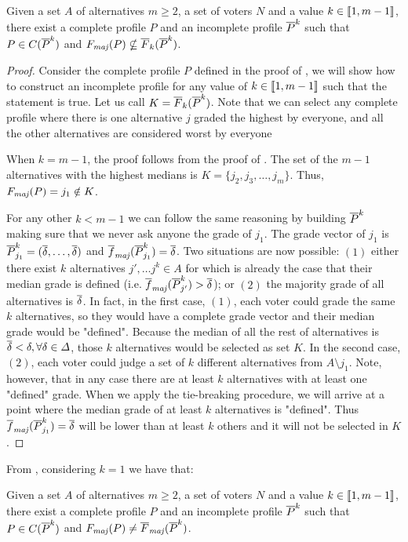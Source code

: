 	\begin{theorem}
		\label{th:uncompleteK}
		Given a set $A$ of alternatives $m\geq 2$, a set of voters $N$ and a value $k\in \llbracket1,m-1\rrbracket$, there exist a complete profile $P$ and an incomplete profile $\overline{P}^k$ such that $P \in C(\overline{P}^k)$ and $\Fmaj(P) \nsubseteq \overline{F}_k(\Pbar^k)$.
	\end{theorem}
	\begin{proof}
		Consider the complete profile $P$ defined in the proof of , we will show how to construct an incomplete profile for any value of $k\in \llbracket1,m-1\rrbracket$ such that the statement is true. Let us call $K=\overline{F}_k(\overline{P}^k)$.
		Note that we can select any complete profile where there is one alternative $j$ graded the highest by everyone, and all the other alternatives are considered worst by everyone
		
		When $k=m-1$, the proof follows from the proof of . The set of the $m-1$ alternatives with the highest medians is $K=\{j_2,j_3,\dots,j_m\}$. Thus, $\Fmaj(P)=j_1 \notin K$.
		
		For any other $k<m-1$ we can follow the same reasoning by building $\overline{P}^k$ making sure that we never ask anyone the grade of $j_1$. 
		The grade vector of $j_1$ is $\overline{P}^k_{j_1}=(\overline{\delta}, \dots, \overline{\delta})$ and $\fmajbar(\Pbar^k_{j_1})=\dbar$.
		Two situations are now possible: $(1)$ either there exist $k$ alternatives $j',\dots j^k\in A$ for which is already the case that their median grade is defined (i.e. $\fmajbar(\Pbar^k_{j'})>\dbar$); or $(2)$ the majority grade of all alternatives is $\overline{\delta}$. 
		In fact, in the first case, $(1)$, each voter could grade the same $k$ alternatives, so they would have a complete grade vector and their median grade would be "defined". Because the median of all the rest of alternatives is $\overline{\delta} < \delta, \forall \delta \in \Delta$, those $k$ alternatives would be selected as set $K$.
		In the second case, $(2)$, each voter could judge a set of $k$ different alternatives from $A\setminus j_1$. Note, however, that in any case there are at least $k$ alternatives with at least one "defined" grade. When we apply the tie-breaking procedure, we will arrive at a point where the median grade of at least $k$ alternatives is "defined". Thus $\fmajbar(\Pbar^k_{j_1})=\dbar$ will be lower than at least $k$ others and it will not be selected in $K$.
	\end{proof}	
	
	From , considering $k=1$ we have that:
	\begin{remark}
		Given a set $A$ of alternatives $m\geq 2$, a set of voters $N$ and a value $k\in \llbracket1,m-1\rrbracket$, there exist a complete profile $P$ and an incomplete profile $\overline{P}^k$ such that $P \in C(\overline{P}^k)$ and $\Fmaj(P) \neq \Fmajbar(\Pbar^k)$.
	\end{remark}

